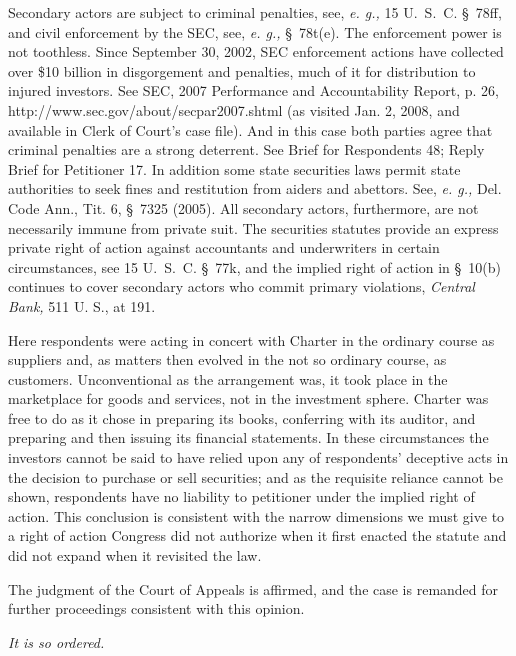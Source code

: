   Secondary actors are subject to criminal penalties, see, \emph{e. g.,} 15 U.~S.~C. \S~78ff, and civil enforcement by the SEC, see, \emph{e. g.,} \S~78t(e). The enforcement power is not toothless. Since September 30, 2002, SEC enforcement actions have collected over \$10 billion in disgorgement and penalties, much of it for distribution to injured investors. See SEC, 2007 Performance and Accountability Report, p. 26, http://www.sec.gov/about/secpar2007.shtml (as visited Jan. 2, 2008, and available in Clerk of Court's case file). And in this case both parties agree that criminal penalties are a strong deterrent. See Brief for Respondents 48; Reply Brief for Petitioner 17. In addition some state securities laws permit state authorities to seek fines and restitution from aiders and abettors. See, \emph{e. g.,} Del. Code Ann., Tit. 6, \S~7325 (2005). All secondary actors, furthermore, are not necessarily immune from private suit. The securities statutes provide an express private right of action against accountants and underwriters in certain circumstances, see 15 U.~S.~C. \S~77k, and the implied right of action in \S~10(b) continues to cover secondary actors who commit primary violations, \emph{Central Bank,} 511 U. S., at 191.

  Here respondents were acting in concert with Charter in the ordinary course as suppliers and, as matters then evolved in the not so ordinary course, as customers. Unconventional as the arrangement was, it took place in the marketplace for goods and services, not in the investment sphere. Charter was free to do as it chose in preparing its books, conferring with its auditor, and preparing and then issuing its financial statements. In these circumstances the investors cannot be \newpage  said to have relied upon any of respondents' deceptive acts in the decision to purchase or sell securities; and as the requisite reliance cannot be shown, respondents have no liability to petitioner under the implied right of action. This conclusion is consistent with the narrow dimensions we must give to a right of action Congress did not authorize when it first enacted the statute and did not expand when it revisited the law.

  The judgment of the Court of Appeals is affirmed, and the case is remanded for further proceedings consistent with this opinion.

\begin{flushright}\emph{It is so ordered.}\end{flushright}
